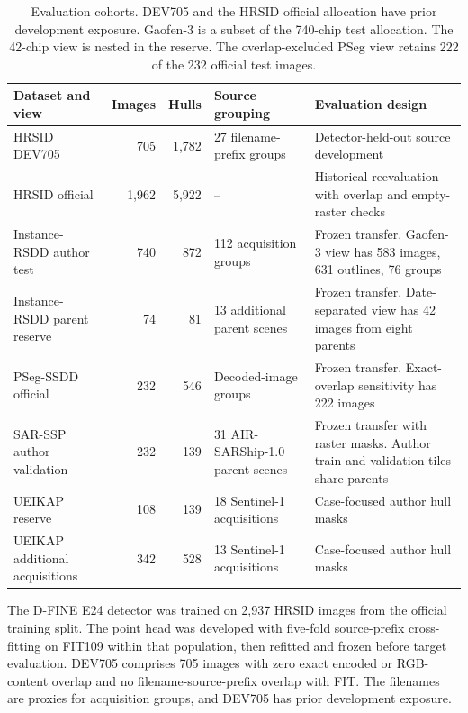\documentclass[journal]{IEEEtran}
\begin{document}
\begin{table}[t]
\centering
\caption{Evaluation cohorts. DEV705 and the HRSID official allocation have prior development exposure. Gaofen-3 is a subset of the 740-chip test allocation. The 42-chip view is nested in the reserve. The overlap-excluded PSeg view retains 222 of the 232 official test images.}
\label{tab:cohorts}
\footnotesize
\renewcommand{\arraystretch}{1.19}
\setlength{\tabcolsep}{5pt}
\begin{tabular}{@{}p{}rrp{}p{}@{}}
\toprule
Dataset and view & Images & Hulls & Source grouping & Evaluation design \\
\midrule
HRSID DEV705 & 705 & 1,782 & 27 filename-prefix groups & Detector-held-out source development \\
HRSID official & 1,962 & 5,922 & -- & Historical reevaluation with overlap and empty-raster checks \\
\addlinespace[1.5pt]
Instance-RSDD author test & 740 & 872 & 112 acquisition groups & Frozen transfer. Gaofen-3 view has 583 images, 631 outlines, 76 groups \\
Instance-RSDD parent reserve & 74 & 81 & 13 additional parent scenes & Frozen transfer. Date-separated view has 42 images from eight parents \\
PSeg-SSDD official & 232 & 546 & Decoded-image groups & Frozen transfer. Exact-overlap sensitivity has 222 images \\
SAR-SSP author validation & 232 & 139 & 31 AIR-SARShip-1.0 parent scenes & Frozen transfer with raster masks. Author train and validation tiles share parents \\
\addlinespace[1.5pt]
UEIKAP reserve & 108 & 139 & 18 Sentinel-1 acquisitions & Case-focused author hull masks \\
UEIKAP additional acquisitions & 342 & 528 & 13 Sentinel-1 acquisitions & Case-focused author hull masks \\
\bottomrule
\end{tabular}
\end{table}

The D-FINE E24 detector was trained on 2,937 HRSID images from the official training split. The point head was developed with five-fold source-prefix cross-fitting on FIT109 within that population, then refitted and frozen before target evaluation. DEV705 comprises 705 images with zero exact encoded or RGB-content overlap and no filename-source-prefix overlap with FIT. The filenames are proxies for acquisition groups, and DEV705 has prior development exposure.
\end{document}
